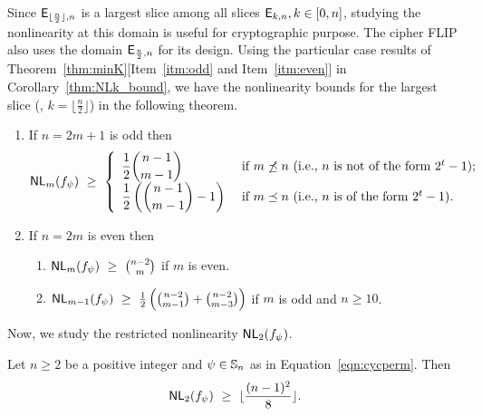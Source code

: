 \documentclass{llncs}
\begin{document}
Since $\mathsf{E}_{\lfloor\frac{n}{2}\rfloor,n}$ is a largest slice among all slices $\mathsf{E}_{k,n}, k \in [0,n]$, studying the nonlinearity at this domain is useful for cryptographic purpose. The cipher FLIP also uses the domain $\mathsf{E}_{\frac{n}{2},n}$ for its design. Using the particular case results of Theorem~\ref{thm:minK}[Item~\ref{itm:odd} and Item~\ref{itm:even}] in Corollary~\ref{thm:NLk_bound}, we have the nonlinearity bounds for the largest slice (\ie, $k = \lfloor\frac{n}{2}\rfloor$) in the following theorem.
\begin{theorem}\label{thm:NLk_boundm}
\begin{enumerate}
\item If $n = 2m+1$ is odd then
$$\mathsf{NL}_{m}(f_\psi) ~\geq ~ 
\left\{ \begin{array}{ll}
\displaystyle{\frac{1}{2}{n-1 \choose m-1}}  & \text{ if }  m \not\preceq n ~(\text{i.e., } n \text{ is not of the form } 2^t-1); \\
\displaystyle{\frac{1}{2}\left({n-1 \choose m-1} - 1\right)} & \text{ if } m \preceq n ~(\text{i.e., } n \text{ is of the form } 2^t-1).
\end{array}  \right.$$
\item If $n = 2m$ is even then 
\begin{enumerate}
 \item $\mathsf{NL}_{m}(f_\psi) ~\geq ~ {n-2 \choose m}$ if $m$ is even.
 \item $\mathsf{NL}_{m-1}(f_\psi) ~\geq ~ \frac{1}{2}\left({n-2 \choose m-1} + {n-2 \choose m-3}\right)$ if $m$ is odd and $n \geq 10$.
\end{enumerate}
\end{enumerate}
\end{theorem}
Now, we study the restricted nonlinearity $\mathsf{NL}_{2}(f_\psi)$.
\begin{theorem}\label{thm:nl2psi}
Let $n \geq 2$ be a positive integer and $\psi \in \mathbb{S}_n$ as in Equation~\ref{eqn:cycperm}.
Then $$\mathsf{NL}_{2}(f_\psi) ~\geq ~ \lfloor\frac{(n-1)^2}{8}\rfloor .$$
\end{theorem}
\end{document}
